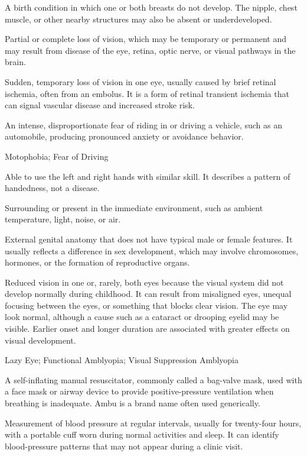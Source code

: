  A birth condition in which one or both breasts do not develop. The nipple, chest muscle, or other nearby structures may also be absent or underdeveloped.

 Partial or complete loss of vision, which may be temporary or permanent and may result from disease of the eye, retina, optic nerve, or visual pathways in the brain.

 Sudden, temporary loss of vision in one eye, usually caused by brief retinal ischemia, often from an embolus. It is a form of retinal transient ischemia that can signal vascular disease and increased stroke risk.

 An intense, disproportionate fear of riding in or driving a vehicle, such as an automobile, producing pronounced anxiety or avoidance behavior.

\synonyms
Motophobia; Fear of Driving

 Able to use the left and right hands with similar skill. It describes a pattern of handedness, not a disease.

 Surrounding or present in the immediate environment, such as ambient temperature, light, noise, or air.

 External genital anatomy that does not have typical male or female features. It usually reflects a difference in sex development, which may involve chromosomes, hormones, or the formation of reproductive organs.

 Reduced vision in one or, rarely, both eyes because the
visual system did not develop normally during childhood. It can result from
misaligned eyes, unequal focusing between the eyes, or something that blocks
clear vision. The eye may look normal, although a cause such as a cataract or
drooping eyelid may be visible. Earlier onset and longer duration are associated with greater effects on visual development.

\synonyms
Lazy Eye; Functional Amblyopia; Visual Suppression Amblyopia

 A self-inflating manual resuscitator, commonly called a bag-valve mask, used with a face mask or airway device to provide positive-pressure ventilation when breathing is inadequate. Ambu is a brand name often used generically.

 Measurement of blood pressure at regular intervals, usually for twenty-four hours, with a portable cuff worn during normal activities and sleep. It can identify blood-pressure patterns that may not appear during a clinic visit.

